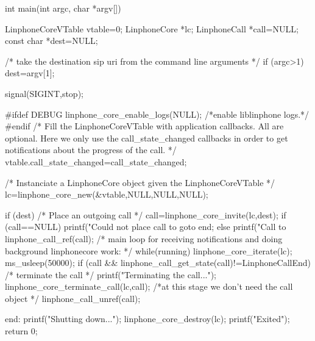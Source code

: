 \begin{DoxyCodeInclude}
int main(int argc, char *argv[]){
        LinphoneCoreVTable vtable={0};
        LinphoneCore *lc;
        LinphoneCall *call=NULL;
        const char *dest=NULL;

        /* take the destination sip uri from the command line arguments */
        if (argc>1){
                dest=argv[1];
        }

        signal(SIGINT,stop);

#ifdef DEBUG
        linphone_core_enable_logs(NULL); /*enable liblinphone logs.*/
#endif
        /* 
         Fill the LinphoneCoreVTable with application callbacks.
         All are optional. Here we only use the call_state_changed callbacks
         in order to get notifications about the progress of the call.
         */
        vtable.call_state_changed=call_state_changed;

        /*
         Instanciate a LinphoneCore object given the LinphoneCoreVTable
        */
        lc=linphone_core_new(&vtable,NULL,NULL,NULL);

        if (dest){
                /*
                 Place an outgoing call
                */
                call=linphone_core_invite(lc,dest);
                if (call==NULL){
                        printf("Could not place call to %
                        goto end;
                }else printf("Call to %
                linphone_call_ref(call);
        }
        /* main loop for receiving notifications and doing background
       linphonecore work: */
        while(running){
                linphone_core_iterate(lc);
                ms_usleep(50000);
        }
        if (call && linphone_call_get_state(call)!=LinphoneCallEnd){
                /* terminate the call */
                printf("Terminating the call...\n");
                linphone_core_terminate_call(lc,call);
                /*at this stage we don't need the call object */
                linphone_call_unref(call);
        }

end:
        printf("Shutting down...\n");
        linphone_core_destroy(lc);
        printf("Exited\n");
        return 0;
}

\end{DoxyCodeInclude}
 